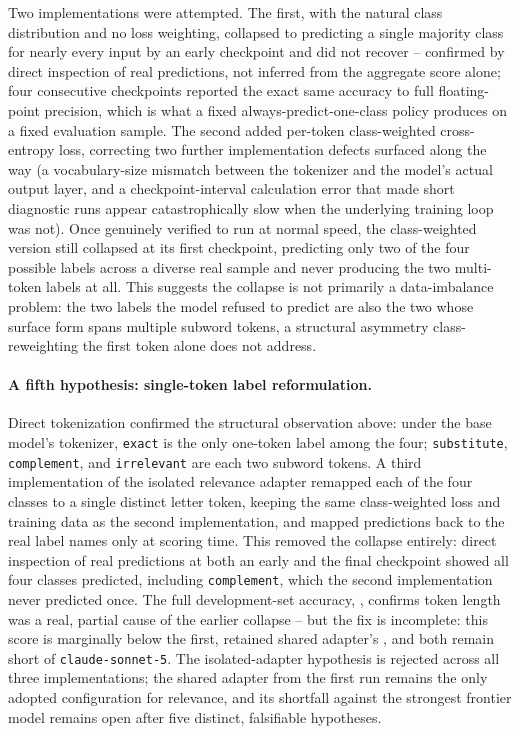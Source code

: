 \documentclass{article}
\newcommand{\code}[1]{\texttt{#1}}
\begin{document}
Two implementations were attempted. The first, with the natural class distribution and no loss weighting, collapsed to predicting a single majority class for nearly every input by an early checkpoint and did not recover -- confirmed by direct inspection of real predictions, not inferred from the aggregate score alone; four consecutive checkpoints reported the exact same accuracy to full floating-point precision, which is what a fixed always-predict-one-class policy produces on a fixed evaluation sample. The second added per-token class-weighted cross-entropy loss, correcting two further implementation defects surfaced along the way (a vocabulary-size mismatch between the tokenizer and the model's actual output layer, and a checkpoint-interval calculation error that made short diagnostic runs appear catastrophically slow when the underlying training loop was not). Once genuinely verified to run at normal speed, the class-weighted version still collapsed at its first checkpoint, predicting only two of the four possible labels across a diverse real sample and never producing the two multi-token labels at all. This suggests the collapse is not primarily a data-imbalance problem: the two labels the model refused to predict are also the two whose surface form spans multiple subword tokens, a structural asymmetry class-reweighting the first token alone does not address.

\paragraph{A fifth hypothesis: single-token label reformulation.} Direct tokenization confirmed the structural observation above: under the base model's tokenizer, \code{exact} is the only one-token label among the four; \code{substitute}, \code{complement}, and \code{irrelevant} are each two subword tokens. A third implementation of the isolated relevance adapter remapped each of the four classes to a single distinct letter token, keeping the same class-weighted loss and training data as the second implementation, and mapped predictions back to the real label names only at scoring time. This removed the collapse entirely: direct inspection of real predictions at both an early and the final checkpoint showed all four classes predicted, including \code{complement}, which the second implementation never predicted once. The full development-set accuracy, \SingleTokenRelevanceAcc{}, confirms token length was a real, partial cause of the earlier collapse -- but the fix is incomplete: this score is marginally below the first, retained shared adapter's \AdapterOneRelevanceAcc{}, and both remain short of \code{claude-sonnet-5}. The isolated-adapter hypothesis is rejected across all three implementations; the shared adapter from the first run remains the only adopted configuration for relevance, and its shortfall against the strongest frontier model remains open after five distinct, falsifiable hypotheses.
\end{document}
